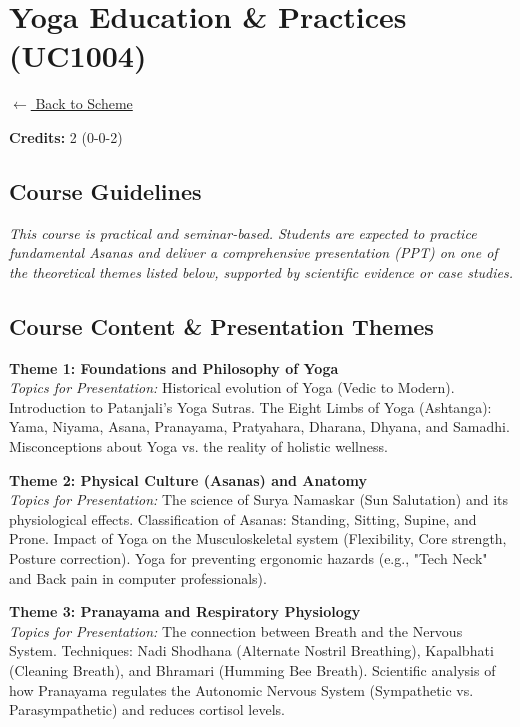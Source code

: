 \section*{Yoga Education \& Practices (UC1004)}
\label{course:UC1004}

\noindent \small{\hyperref[main:scheme]{$\leftarrow$ Back to Scheme}} \vspace{0.5cm}

\noindent \textbf{Credits:} 2 (0-0-2)

\subsection*{Course Guidelines}
\noindent \textit{This course is practical and seminar-based. Students are expected to practice fundamental Asanas and deliver a comprehensive presentation (PPT) on one of the theoretical themes listed below, supported by scientific evidence or case studies.}

\subsection*{Course Content \& Presentation Themes}
\noindent\textbf{Theme 1: Foundations and Philosophy of Yoga} \\
\textit{Topics for Presentation:} Historical evolution of Yoga (Vedic to Modern). Introduction to Patanjali’s Yoga Sutras. The Eight Limbs of Yoga (Ashtanga): Yama, Niyama, Asana, Pranayama, Pratyahara, Dharana, Dhyana, and Samadhi. Misconceptions about Yoga vs. the reality of holistic wellness.

\vspace{0.3cm}

\noindent\textbf{Theme 2: Physical Culture (Asanas) and Anatomy} \\
\textit{Topics for Presentation:} The science of Surya Namaskar (Sun Salutation) and its physiological effects. Classification of Asanas: Standing, Sitting, Supine, and Prone. Impact of Yoga on the Musculoskeletal system (Flexibility, Core strength, Posture correction). Yoga for preventing ergonomic hazards (e.g., "Tech Neck" and Back pain in computer professionals).

\vspace{0.3cm}

\noindent\textbf{Theme 3: Pranayama and Respiratory Physiology} \\
\textit{Topics for Presentation:} The connection between Breath and the Nervous System. Techniques: Nadi Shodhana (Alternate Nostril Breathing), Kapalbhati (Cleaning Breath), and Bhramari (Humming Bee Breath). Scientific analysis of how Pranayama regulates the Autonomic Nervous System (Sympathetic vs. Parasympathetic) and reduces cortisol levels.

